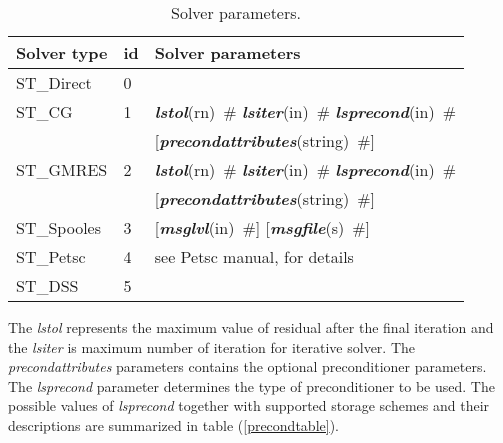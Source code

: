 \documentclass[draft]{article}
\newcommand{\param}[1]{{\em #1}}
\newcommand{\keywordnotype}[1]{\mbox{{\it{\bf{#1}}}}}
\newcommand{\keyword}[2]{\mbox{{\keywordnotype{#1}\tiny (#2)}}}
\newcommand{\field}[2]{\mbox{\keyword{#1}{#2}~\#}}
\newcommand{\optField}[2]{\mbox{[\field{#1}{#2}]}}
\begin{document}
\begin{table}[h]                                                                
\begin{center}                                                                  
\begin{tabular}{|l|l|l|}                                                      
\hline                                                                          
Solver type & id & Solver parameters \\
\hline
ST\_Direct & 0 &\\
ST\_CG & 1 & \field{lstol}{rn} \field{lsiter}{in}
\field{lsprecond}{in}\\
                  & &  \optField{precondattributes}{string}\\

ST\_GMRES & 2 & \field{lstol}{rn} \field{lsiter}{in}
\field{lsprecond}{in}\\
                  & &  \optField{precondattributes}{string}\\


ST\_Spooles & 3&  \optField{msglvl}{in} \optField{msgfile}{s}\\
ST\_Petsc & 4 & see Petsc manual, for details\footnotemark\\
ST\_DSS & 5& \\ 
\hline
\end{tabular}                                                                   
\caption{Solver parameters.}                
\label{sparsesolverparams}                                                         
\end{center}                                                                    
\end{table}      
The \param{lstol} represents the maximum value of residual after the
final iteration and the \param{lsiter} is maximum number of iteration  for
iterative solver. 
The \param{precondattributes} parameters contains the optional
preconditioner parameters.
The \param{lsprecond} parameter determines the type of preconditioner to be
used. The possible values of \param{lsprecond} together with supported
storage schemes and their descriptions are summarized in table
(\ref{precondtable}).
\end{document}
